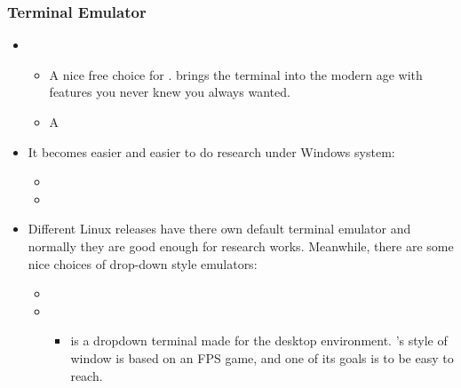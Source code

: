 \documentclass[letterpaper,10pt,english]{sphinxmanual}
\begin{document}
\subsubsection{Terminal Emulator}
\label{\detokenize{resource/research/computer_basics:terminal-emulator}}\begin{itemize}
\item {} 
\begin{itemize}
\item {} 
A nice free choice for .
 brings the
terminal into the modern age with features you never knew you
always wanted.

\item {} 
A 

\end{itemize}

\item {} 
It becomes easier and easier to do research under Windows system:
\begin{itemize}
\item {} 

\item {} 

\end{itemize}

\item {} 
Different Linux releases have there own default terminal emulator and
normally they are good enough for research works. Meanwhile, there
are some nice choices of drop-down style emulators:
\begin{itemize}
\item {} 

\item {} 
\begin{itemize}
\item {} 
 is a dropdown terminal made for the  desktop
environment. ’s style of window is based on an FPS
game, and one of its goals is to be easy to reach.

\end{itemize}

\end{itemize}

\end{itemize}
\end{document}
